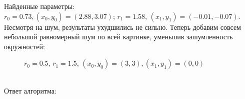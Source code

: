 Найденные параметры: $r_0 = 0.73, (x_0, y_0) = (2.88, 3.07); \, r_1 = 1.58, \, (x_1, y_1) = (-0.01, -0.07)$. Несмотря на шум, результаты ухудшились не сильно. \newpage
Теперь добавим совсем небольшой равномерный шум по всей картинке, уменьшив зашумленность окружностей:
\begin{figure}[h]
\caption{$r_0 = 0.5, \, r_1 = 1.5, \, (x_0, y_0) = (3, 3), (x_1, y_1) = (0, 0)$}
\end{figure} \\
Ответ алгоритма: \\
\begin{figure}[h]
\end{figure}\\
